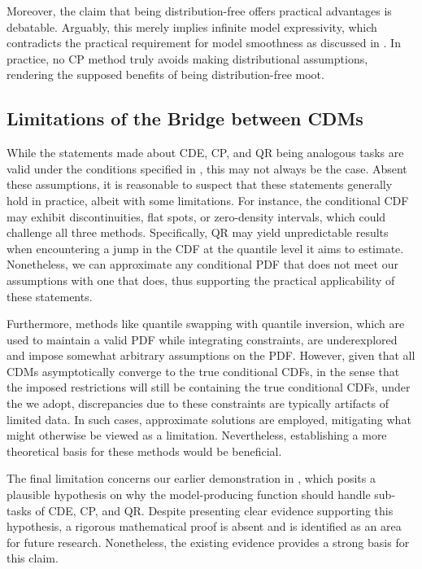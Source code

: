Moreover, the claim that being distribution-free offers practical advantages is debatable. Arguably, this merely implies infinite model expressivity, which contradicts the practical requirement for model smoothness as discussed in . In practice, no CP method truly avoids making distributional assumptions, rendering the supposed benefits of being distribution-free moot.

\subsection{Limitations of the Bridge between CDMs}

While the statements made about CDE, CP, and QR being analogous tasks are valid under the conditions specified in , this may not always be the case. Absent these assumptions, it is reasonable to suspect that these statements generally hold in practice, albeit with some limitations. For instance, the conditional CDF may exhibit discontinuities, flat spots, or zero-density intervals, which could challenge all three methods. Specifically, QR may yield unpredictable results when encountering a jump in the CDF at the quantile level it aims to estimate. Nonetheless, we can approximate any conditional PDF that does not meet our assumptions with one that does, thus supporting the practical applicability of these statements.

Furthermore, methods like quantile swapping with quantile inversion, which are used to maintain a valid PDF while integrating constraints, are underexplored and impose somewhat arbitrary assumptions on the PDF. However, given that all CDMs asymptotically converge to the true conditional CDFs, in the sense that the imposed restrictions will still be containing the true conditional CDFs, under the  we adopt, discrepancies due to these constraints are typically artifacts of limited data. In such cases, approximate solutions are employed, mitigating what might otherwise be viewed as a limitation. Nevertheless, establishing a more theoretical basis for these methods would be beneficial.

The final limitation concerns our earlier demonstration in , which posits a plausible hypothesis on why the model-producing function should handle sub-tasks of CDE, CP, and QR. Despite presenting clear evidence supporting this hypothesis, a rigorous mathematical proof is absent and is identified as an area for future research. Nonetheless, the existing evidence provides a strong basis for this claim.

